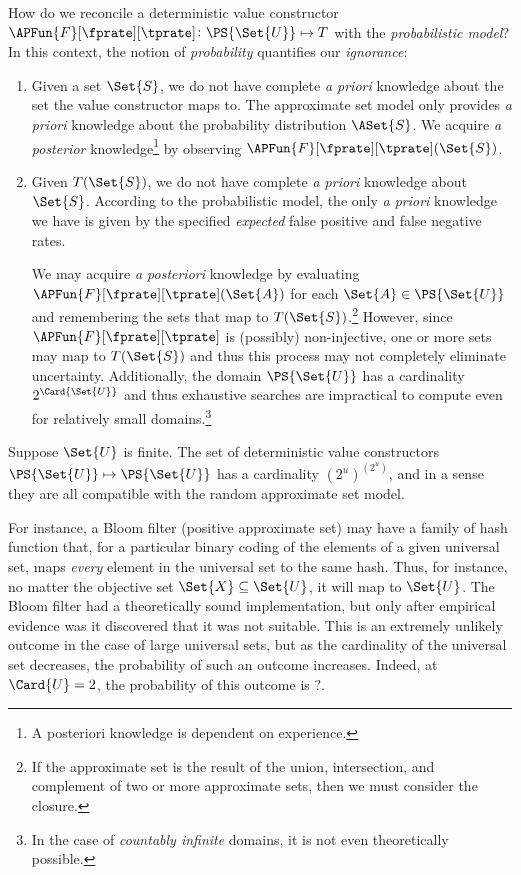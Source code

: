 \documentclass[ ../main.tex]{subfiles}
\newcommand{\ctor}[2]{\APFun{F}[#1][#2]}
\begin{document}
How do we reconcile a deterministic value constructor $\ctor{\fprate}{\tprate} \colon \PS{\Set{U}} \mapsto T$ with the \emph{probabilistic model}?
In this context, the notion of \emph{probability} quantifies our \emph{ignorance}:
\begin{enumerate}
\item Given a set $\Set{S}$, we do not have complete \emph{a priori} knowledge about the set the value constructor maps to.
The approximate set model only provides \emph{a priori} knowledge about the probability distribution $\ASet{S}$.
We acquire \emph{a posterior} knowledge\footnote{A posteriori knowledge is dependent on experience.} by observing $\ctor{\fprate}{\tprate}(\Set{S})$.

\item Given $T(\Set{S})$, we do not have complete \emph{a priori} knowledge about $\Set{S}$.
According to the probabilistic model, the only \emph{a priori} knowledge we have is given by the specified \emph{expected} false positive and false negative rates.

We may acquire \emph{a posteriori} knowledge by evaluating $\ctor{\fprate}{\tprate}(\Set{A})$ for each $\Set{A} \in \PS{\Set{U}}$ and remembering the sets that map to $T(\Set{S})$.\footnote{If the approximate set is the result of the union, intersection, and complement of two or more approximate sets, then we must consider the closure.}
However, since $\ctor{\fprate}{\tprate}$ is (possibly) non-injective, one or more sets may map to $T(\Set{S})$ and thus this process may not completely eliminate uncertainty.
Additionally, the domain $\PS{\Set{U}}$ has a cardinality $2^{\Card{\Set{U}}}$ and thus exhaustive searches are impractical to compute even for relatively small domains.\footnote{In the case of \emph{countably infinite} domains, it is not even theoretically possible.}
\end{enumerate}

Suppose $\Set{U}$ is finite. The set of deterministic value constructors 
$\PS{\Set{U}} \mapsto \PS{\Set{U}}$ has a cardinality $(2^u)^(2^u)$, and in a 
sense they are all compatible with the random approximate set model.

For instance, a 
Bloom filter (positive approximate set) may have a family of 
hash function that, for a particular binary coding of the 
elements of a given universal set, maps \emph{every} element 
in the universal set to the same hash. Thus, for instance, no 
matter the objective set $\Set{X} \subseteq \Set{U}$, it will 
map to $\Set{U}$. The Bloom filter had a theoretically sound 
implementation, but only after empirical evidence was it 
discovered that it was not suitable. This is an extremely 
unlikely outcome in the case of large universal sets, but as 
the cardinality of the universal set decreases, the 
probability of such an outcome increases. Indeed, at 
$\Card{U} = 2$, the probability of this outcome is $?$.
\end{document}
